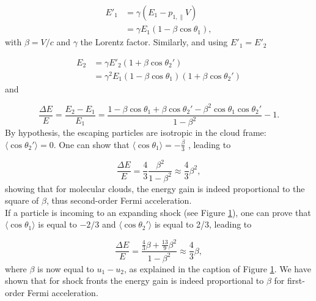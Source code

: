 \begin{figure}[t]
%
\label{fig:cloud}
\end{figure}

\begin{equation}
\begin{split}
E'_1 &= \gamma \left(E_1 - p_{1,\parallel} V\right) \\
&= \gamma E_1 \left(1-\beta \cos \theta_1\right),
\end{split}
\end{equation}
with $\beta = V/c$ and $\gamma$ the Lorentz factor. Similarly, and using $E'_1 = E'_2$

\begin{equation}
\begin{split}
E_2 &= \gamma E'_2 \left(1+\beta \cos \theta_2'\right)\\
&=\gamma^2 E_1 \left(1-\beta \cos \theta_1\right) \left( 1 + \beta \cos \theta_2'\right)
\end{split}
\end{equation}
and

\begin{equation}
\frac{\Delta E}{E} = \frac{E_2 -E_1}{E_1} = \frac{1 - 
\beta \cos \theta_1 + \beta \cos \theta_2' - \beta^2 \cos \theta_1 \cos \theta_2'}{1-\beta^2} -1.
\end{equation}
By hypothesis, the escaping particles are isotropic in the cloud frame: $\langle \cos \theta_2' \rangle = 0$. One can show that $\langle \cos \theta_1 \rangle = -\frac{\beta}{3}$ \cite{Gaisser:2016uoy}, leading to

\begin{equation}
\frac{\Delta E}{E} = \frac{4}{3} \frac{\beta^2}{1-\beta^2} \approx \frac{4}{3} \beta^2,
\end{equation}
showing that for molecular clouds, the energy gain is indeed proportional to the square of $\beta$, thus second-order Fermi acceleration.\\
\newline
If a particle is incoming to an expanding shock (see Figure \ref{fig:cloud}), one can prove that $\langle \cos \theta_1\rangle$ is equal to $-2/3$ and $\langle \cos \theta_2'\rangle$ is equal to 2/3, leading to

\begin{equation}
\frac{\Delta E}{E} = \frac{\frac{4}{3}\beta + \frac{13}{9}\beta^2}{1-\beta^2} \approx \frac{4}{3} \beta,
\end{equation}
where $\beta$ is now equal to $u_1 -u_2$, as explained in the caption of Figure \ref{fig:cloud}. We have shown that for shock fronts the energy gain is indeed proportional to $\beta$ for first-order Fermi acceleration. 

